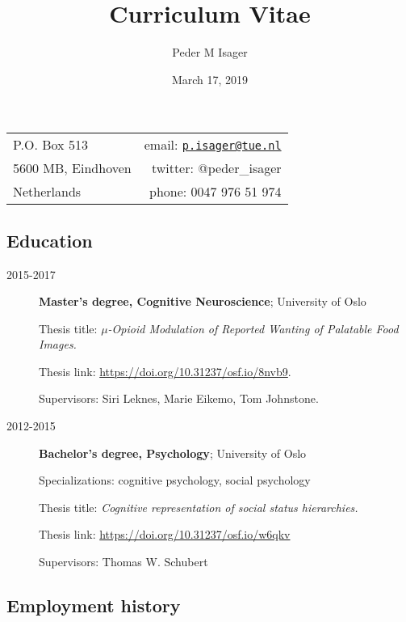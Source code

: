 \documentclass[]{article}
\title{Curriculum Vitae}
\author{Peder M Isager}
\date{March 17, 2019}
\begin{document}
\maketitle

\begin{longtable}[]{@{}lr@{}}
\toprule
\endhead
P.O. Box 513 & email:
\href{mailto:p.isager@tue.nl}{\nolinkurl{p.isager@tue.nl}}\tabularnewline
5600 MB, Eindhoven & twitter: @peder\_isager\tabularnewline
Netherlands & phone: 0047 976 51 974\tabularnewline
\bottomrule
\end{longtable}

\hypertarget{education}{%
\subsection{Education}\label{education}}

\begin{description}
\item[2015-2017]
\textbf{Master's degree, Cognitive Neuroscience}; University of Oslo

Thesis title: \emph{\(\mu\)-Opioid Modulation of Reported Wanting of
Palatable Food Images.}

Thesis link: \url{https://doi.org/10.31237/osf.io/8nvb9}.

Supervisors: Siri Leknes, Marie Eikemo, Tom Johnstone.\\
\item[2012-2015]
\textbf{Bachelor's degree, Psychology}; University of Oslo

Specializations: cognitive psychology, social psychology

Thesis title: \emph{Cognitive representation of social status
hierarchies.}

Thesis link: \url{https://doi.org/10.31237/osf.io/w6qkv}

Supervisors: Thomas W. Schubert
\end{description}

\hypertarget{employment-history}{%
\subsection{Employment history}\label{employment-history}}
\end{document}
